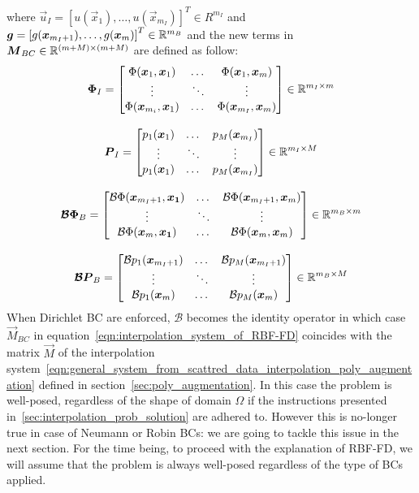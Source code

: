 where $\vec{u}_I = \left[ u(\vec{x}_1), \dots, u(\vec{x}_{m_I}) \right]^T \in R^{m_I}$ and $\boldsymbol{g} = \left[g(\boldsymbol{x}_{m_I+1}), \dots, g(\boldsymbol{x}_m)\right]^T \in \mathbb{R}^{m_B}$ and the new terms in $\boldsymbol{M}_{BC} \in \mathbb{R}^{(m+M) \times (m+M)}$ are defined as follow:
\begin{equation}
	\begin{gathered}
		\boldsymbol{\Phi}_I = \begin{bmatrix}
							\Phi(\boldsymbol{x}_1, \boldsymbol{x}_1)    	  &    \dots    & \Phi(\boldsymbol{x}_1, \boldsymbol{x}_m)  		\\
							\vdots						  	  &  \ddots		& \vdots					  		\\
							\Phi(\boldsymbol{x}_{m_i}, \boldsymbol{x}_1)    &    \dots    & \Phi(\boldsymbol{x}_{m_I}, \boldsymbol{x}_m)
					   \end{bmatrix} \in \mathbb{R}^{m_I \times m}  \\[2ex]
		\boldsymbol{P}_I = \begin{bmatrix}
							p_1(\boldsymbol{x}_{1})	&  \dots  &  p_M(\boldsymbol{x}_{m_I})   \\
							\vdots				& \ddots  & \vdots					\\	
							p_1(\boldsymbol{x}_{1})	&  \dots  &  p_M(\boldsymbol{x}_{m_I})
					\end{bmatrix} \in \mathbb{R}^{m_I \times M}  \\[2ex]
		\boldsymbol{\mathcal{B}\Phi}_B = \begin{bmatrix}
										\mathcal{B}\Phi(\boldsymbol{x}_{m_I+1}, \boldsymbol{x_1})  &  \dots  & \mathcal{B}\Phi(\boldsymbol{x}_{m_I+1}, \boldsymbol{x}_m)  \\
										\vdots										 & \ddots  & \vdots										  \\
										\mathcal{B}\Phi(\boldsymbol{x}_{m}, \boldsymbol{x_1})  	 &  \dots  & \mathcal{B}\Phi(\boldsymbol{x}_{m}, \boldsymbol{x}_m)
								  \end{bmatrix} \in \mathbb{R}^{m_B \times m}  \\[2ex]
		\boldsymbol{\mathcal{B}P}_B = \begin{bmatrix}
									\mathcal{B}p_1(\boldsymbol{x}_{m_I+1})  &  \dots  & \mathcal{B}p_M(\boldsymbol{x}_{m_I+1})  \\
									\vdots							 & \ddots  & \vdots							  \\
									\mathcal{B}p_1(\boldsymbol{x}_{m})  	 &  \dots  & \mathcal{B}p_M(\boldsymbol{x}_{m})
							  \end{bmatrix} \in \mathbb{R}^{m_B \times M}
	\end{gathered}
\end{equation}
When Dirichlet BC are enforced, $\mathcal{B}$ becomes the identity operator in which case $\vec{M}_{BC}$ in equation~\eqref{eqn:interpolation_system_of_RBF-FD} coincides with the matrix $\vec{M}$ of the interpolation system~\eqref{eqn:general_system_from_scattred_data_interpolation_poly_augmentation} defined in section~\vref{sec:poly_augmentation}. In this case the problem is well-posed, regardless of the shape of domain $\Omega$ if the instructions presented in~\vref{sec:interpolation_prob_solution} are adhered to. However this is no-longer true in case of Neumann or Robin BCs: we are going to tackle this issue in the next section. For the time being, to proceed with the explanation of RBF-FD, we will assume that the problem is always well-posed regardless of the type of BCs applied.

